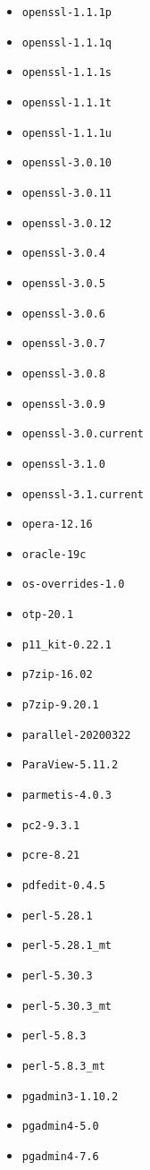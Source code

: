\begin{multicols}{3}
\begin{itemize}
\item \verb|openssl-1.1.1p|
\item \verb|openssl-1.1.1q|
\item \verb|openssl-1.1.1s|
\item \verb|openssl-1.1.1t|
\item \verb|openssl-1.1.1u|
\item \verb|openssl-3.0.10|
\item \verb|openssl-3.0.11|
\item \verb|openssl-3.0.12|
\item \verb|openssl-3.0.4|
\item \verb|openssl-3.0.5|
\item \verb|openssl-3.0.6|
\item \verb|openssl-3.0.7|
\item \verb|openssl-3.0.8|
\item \verb|openssl-3.0.9|
\item \verb|openssl-3.0.current|
\item \verb|openssl-3.1.0|
\item \verb|openssl-3.1.current|
\item \verb|opera-12.16|
\item \verb|oracle-19c|
\item \verb|os-overrides-1.0|
\item \verb|otp-20.1|
\item \verb|p11_kit-0.22.1|
\item \verb|p7zip-16.02|
\item \verb|p7zip-9.20.1|
\item \verb|parallel-20200322|
\item \verb|ParaView-5.11.2|
\item \verb|parmetis-4.0.3|
\item \verb|pc2-9.3.1|
\item \verb|pcre-8.21|
\item \verb|pdfedit-0.4.5|
\item \verb|perl-5.28.1|
\item \verb|perl-5.28.1_mt|
\item \verb|perl-5.30.3|
\item \verb|perl-5.30.3_mt|
\item \verb|perl-5.8.3|
\item \verb|perl-5.8.3_mt|
\item \verb|pgadmin3-1.10.2|
\item \verb|pgadmin4-5.0|
\item \verb|pgadmin4-7.6|

\end{itemize}
\end{multicols}
